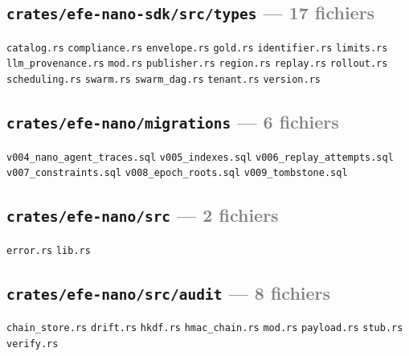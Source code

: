 \documentclass[10pt]{report}
\newcommand{\code}[1]{\texttt{\small #1}}
\begin{document}
\subsection*{\code{crates/efe-nano-sdk/src/types} \normalfont\textcolor{grey}{--- 17 fichiers}}
\begin{sloppypar}\footnotesize\raggedright
\code{catalog.rs} \;\textbullet\; \code{compliance.rs} \;\textbullet\; \code{envelope.rs} \;\textbullet\; \code{gold.rs} \;\textbullet\; \code{identifier.rs} \;\textbullet\; \code{limits.rs} \;\textbullet\; \code{llm\_provenance.rs} \;\textbullet\; \code{mod.rs} \;\textbullet\; \code{publisher.rs} \;\textbullet\; \code{region.rs} \;\textbullet\; \code{replay.rs} \;\textbullet\; \code{rollout.rs} \;\textbullet\; \code{scheduling.rs} \;\textbullet\; \code{swarm.rs} \;\textbullet\; \code{swarm\_dag.rs} \;\textbullet\; \code{tenant.rs} \;\textbullet\; \code{version.rs}
\end{sloppypar}

\subsection*{\code{crates/efe-nano/migrations} \normalfont\textcolor{grey}{--- 6 fichiers}}
\begin{sloppypar}\footnotesize\raggedright
\code{v004\_nano\_agent\_traces.sql} \;\textbullet\; \code{v005\_indexes.sql} \;\textbullet\; \code{v006\_replay\_attempts.sql} \;\textbullet\; \code{v007\_constraints.sql} \;\textbullet\; \code{v008\_epoch\_roots.sql} \;\textbullet\; \code{v009\_tombstone.sql}
\end{sloppypar}

\subsection*{\code{crates/efe-nano/src} \normalfont\textcolor{grey}{--- 2 fichiers}}
\begin{sloppypar}\footnotesize\raggedright
\code{error.rs} \;\textbullet\; \code{lib.rs}
\end{sloppypar}

\subsection*{\code{crates/efe-nano/src/audit} \normalfont\textcolor{grey}{--- 8 fichiers}}
\begin{sloppypar}\footnotesize\raggedright
\code{chain\_store.rs} \;\textbullet\; \code{drift.rs} \;\textbullet\; \code{hkdf.rs} \;\textbullet\; \code{hmac\_chain.rs} \;\textbullet\; \code{mod.rs} \;\textbullet\; \code{payload.rs} \;\textbullet\; \code{stub.rs} \;\textbullet\; \code{verify.rs}
\end{sloppypar}
\end{document}
